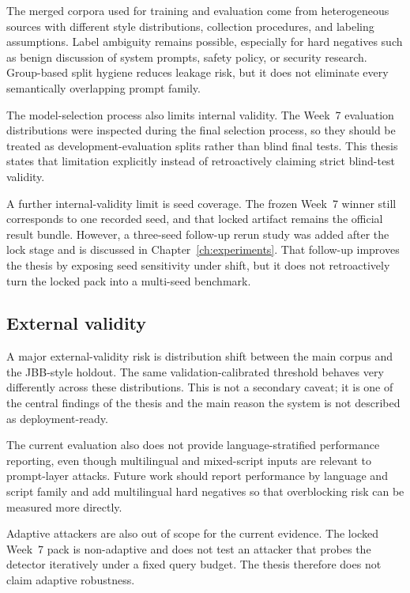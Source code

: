 The merged corpora used for training and evaluation come from heterogeneous sources with different style distributions, collection procedures, and labeling assumptions. Label ambiguity remains possible, especially for hard negatives such as benign discussion of system prompts, safety policy, or security research. Group-based split hygiene reduces leakage risk, but it does not eliminate every semantically overlapping prompt family.

The model-selection process also limits internal validity. The Week~7 evaluation distributions were inspected during the final selection process, so they should be treated as development-evaluation splits rather than blind final tests. This thesis states that limitation explicitly instead of retroactively claiming strict blind-test validity.

A further internal-validity limit is seed coverage. The frozen Week~7 winner still corresponds to one recorded seed, and that locked artifact remains the official result bundle. However, a three-seed follow-up rerun study was added after the lock stage and is discussed in Chapter~\ref{ch:experiments}. That follow-up improves the thesis by exposing seed sensitivity under shift, but it does not retroactively turn the locked pack into a multi-seed benchmark.

\subsection{External validity}

A major external-validity risk is distribution shift between the main corpus and the JBB-style holdout. The same validation-calibrated threshold behaves very differently across these distributions. This is not a secondary caveat; it is one of the central findings of the thesis and the main reason the system is not described as deployment-ready.

The current evaluation also does not provide language-stratified performance reporting, even though multilingual and mixed-script inputs are relevant to prompt-layer attacks. Future work should report performance by language and script family and add multilingual hard negatives so that overblocking risk can be measured more directly.

Adaptive attackers are also out of scope for the current evidence. The locked Week~7 pack is non-adaptive and does not test an attacker that probes the detector iteratively under a fixed query budget. The thesis therefore does not claim adaptive robustness.

